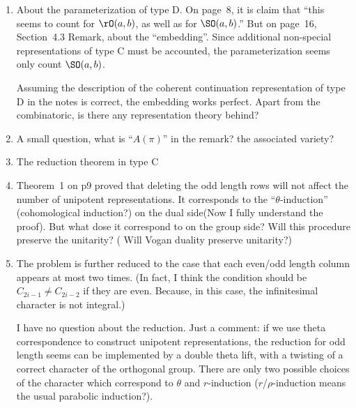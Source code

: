\documentclass[12pt,a4paper]{amsart}
\numberwithin{equation}{section}
\theoremstyle{remark}
\begin{document}
{\begin{enumerate}
  Here are two questions:
  \begin{enumerate}
  \item If $m=0$, how to distinguish $I$ and $II$? (This may not be a big problem
    for us).  
  \item If $|\sigma_R| = |\sigma_L|$, the branching rule seems more
    complicated, since a bipartition of the same left and right components may
    occur.
    The we should choose the same sign?
  \end{enumerate}
\item About the parameterization of type D.
  On page~8, it is claim that ``this seems to count for $\rO(a,b)$, as well as
  for $\SO(a,b)$.''
  But on page~16, Section~4.3 Remark, about the ``embedding''. Since additional
  non-special representations of type C must be accounted, the parameterization
  seems only count $\SO(a,b)$. 

  Assuming the description of the coherent continuation representation of type D
  in the notes is correct, the embedding works perfect. Apart from the
  combinatoric, is there any representation theory behind? 
\item A small question, what is ``$A(\pi)$'' in the remark? the associated
  variety? 
\item[] {\color{red} The reduction theorem in type C}
\item Theorem~1 on p9 proved that deleting the odd length rows will not affect
  the number of unipotent representations.  It corresponds to the
  ``$\theta$-induction'' (cohomological induction?) on the dual side(Now I fully
  understand the proof). But what dose it correspond to on the group side? Will
  this procedure preserve the unitarity?  ( Will Vogan duality preserve
  unitarity?)
\item The problem is further reduced to the case that each even/odd length column
  appears at most two times. (In fact, I think the condition should be
  $C_{2i-1}\neq C_{2i-2}$ if they are even. Because, in this case, the
  infinitesimal character is not integral.)

  I have no question about the reduction. Just a comment:
  if we use theta correspondence to construct unipotent representations,
  the reduction for odd length seems can be implemented by a double theta lift,
  with a twisting of a correct character of the orthogonal group. 
  There are only two possible choices of the character which correspond to
  $\theta$ and $r$-induction ($r$/$\rho$-induction means the usual parabolic
  induction?). 
\end{enumerate}
}
\end{document}
